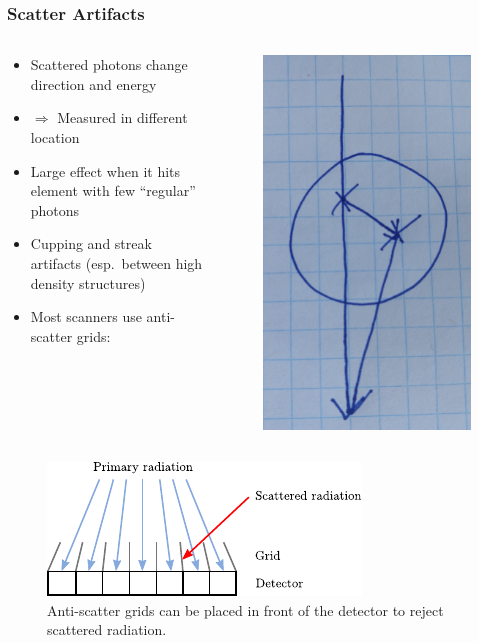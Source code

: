 	\begin{frame}
	\frametitle{Scatter Artifacts}
	\begin{columns}[c, onlytextwidth]
		\begin{column}{0.75\textwidth}
		\begin{itemize}
			\item Scattered photons change direction and energy
			\item[ ] $\Rightarrow$ Measured in different location
			\item Large effect when it hits element with few ``regular'' photons

			\item Cupping and streak artifacts (esp.\ between high density structures)
			\item Most scanners use anti-scatter grids:
		\end{itemize}
		\end{column}
		\begin{column}{0.25\textwidth}
		 \begin{figure}
			\centering
			\includegraphics[height=0.75\textwidth]{images/scatter_sketch}
		 \end{figure}
	\end{column}
	\end{columns}

	\begin{figure}
		\centering
		\includegraphics[width=0.45\linewidth]{images/scatter_1}
		\caption{Anti-scatter grids can be placed in front of the detector to reject scattered radiation.}
		\label{fig:ct_scatter_1}
	\end{figure}

\end{frame}

